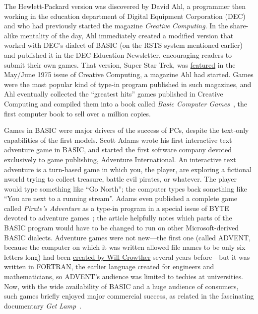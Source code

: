 
The Hewlett-Packard version was discovered by David Ahl, a programmer
then working in the education department of Digital Equipment
Corporation (DEC) and who had previously started the magazine
\emph{Creative Computing}.
In the share-alike mentality of the day, Ahl immediately created a
modified version that worked with DEC's dialect of BASIC (on the RSTS
system mentioned earlier) and published it in the DEC Education
Newsletter, encouraging readers to submit their own games.
That version, Super Star Trek, was
\href{https://archive.org/details/CreativeComputingv01n04MayJune1975/page/n41}{featured}
in the May/June 1975 issue of Creative Computing, a magazine Ahl had
started.
Games were the most popular kind of type-in program published in such
magazines, and Ahl eventually collected the ``greatest hits'' games
published in Creative Computing and compiled them into a book called
\emph{Basic Computer Games}~\cite{basic_computer_games}, the first
computer book to sell over a million copies.

Games in BASIC were major drivers of the success of PCs, despite the
text-only capabilities of the first models.
Scott Adams wrote his first interactive text adventure game in BASIC,
and started the first software company devoted exclusively to game
publishing, Adventure International.
An interactive text adventure is a turn-based game in which you, the
player, are exploring a fictional nworld trying to collect treasure,
battle evil pirates, or whatever.
The player would type something like ``Go North''; the computer types
back something like ``You are next to a running stream''.
Adams even published a complete game called \emph{Pirate's Adventure}
as a type-in program in a special issue of BYTE devoted to adventure
games~\cite{byte80:adventure}; the article helpfully notes which parts
of the BASIC program would have to be changed to run on other
Microsoft-derived BASIC dialects.
Adventure games were not new---the first one (called ADVENT, because
the computer on which it was written allowed file names to be only six
letters long) had been
\href{https://armandofox.blogspot.com/2007/08/the-original-original-adventure.html}{created
by Will Crowther} several years before---but it was written in
FORTRAN, the earlier language created for engineers and
mathematicians, so ADVENT's audience was limited to techies at
universities.
Now, with the wide availability of BASIC and a huge audience of
consumers, such games briefly enjoyed major commercial success, as
related in the fascinating documentary \emph{Get
Lamp}~\cite{get_lamp}.

